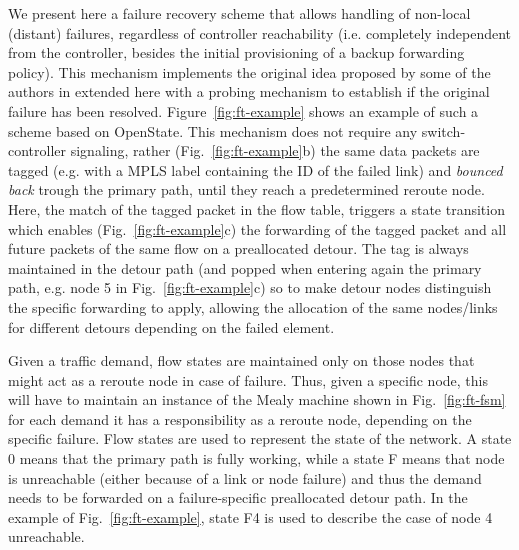 \documentclass[10pt,conference]{IEEEtran}
\begin{document}
We present here a failure recovery scheme that allows handling of non-local (distant) failures, regardless of controller reachability (i.e. completely independent from the controller, besides the initial provisioning of a backup forwarding policy). This mechanism implements the original idea proposed by some of the authors in \cite{Cap15} extended here with a probing mechanism to establish if the original failure has been resolved. Figure~\ref{fig:ft-example} shows an example of such a scheme based on OpenState. This mechanism does not require any switch-controller signaling, rather (Fig.~\ref{fig:ft-example}b) the same data packets are tagged (e.g. with a MPLS label containing the ID of the failed link) and \emph{bounced back} trough the primary path, until they reach a predetermined reroute node. Here, the match of the tagged packet in the flow table, triggers a state transition which enables (Fig.~\ref{fig:ft-example}c) the forwarding of the tagged packet and all future packets of the same flow on a preallocated detour. The tag is always maintained in the detour path (and popped when entering again the primary path, e.g. node 5 in Fig.~\ref{fig:ft-example}c) so to make detour nodes distinguish the specific forwarding to apply, allowing the allocation of the same nodes/links for different detours depending on the failed element.

Given a traffic demand, flow states are maintained only on those nodes that might act as a reroute node in case of failure. Thus, given a specific node, this will have to maintain an instance of the Mealy machine shown in Fig.~\ref{fig:ft-fsm} for each demand it has a responsibility as a reroute node, depending on the specific failure. Flow states are used to represent the state of the network. A state 0 means that the primary path is fully working, while a state F means that node  is unreachable (either because of a link or node failure) and thus the demand needs to be forwarded on a failure-specific preallocated detour path. In the example of Fig.~\ref{fig:ft-example}, state F4 is used to describe the case of node 4 unreachable.
\end{document}

